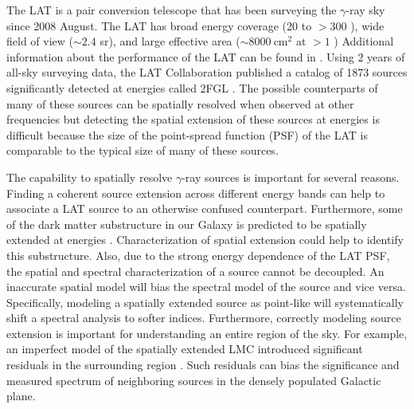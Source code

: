 \documentclass[12pt,preprint]{aastex}
\newcommand{\mev}{\text{MeV}\xspace}
\newcommand{\gev}{\text{GeV}\xspace}
\newcommand{\cm}{\text{cm}\xspace}
\begin{document}
The LAT is a pair conversion telescope that has been surveying the
$\gamma$-ray sky since 2008 August.  The LAT has broad energy coverage
(20 \mev to $>300$ \gev), wide field of view ($\sim 2.4$ sr), and large
effective area ($\sim 8000\ \cm^2$ at $>1$ \gev) 
Additional information about the performance of the LAT can be found in
\cite{atwood_LAT_mission}.
Using 2 years of all-sky surveying data, the LAT Collaboration published
a catalog of 1873
sources significantly detected at \gev energies called 2FGL \citep{second_cat}.
The possible counterparts of many of these sources can be spatially resolved
when observed at other frequencies but detecting the spatial extension
of these sources at \gev energies is difficult because the size of the
point-spread function (PSF) of the LAT is comparable to the typical size
of many of these sources.

The capability to spatially resolve \gev $\gamma$-ray
sources is important for several reasons.  
Finding a coherent source extension across different energy bands can
help to associate a LAT source to an otherwise confused counterpart.
Furthermore, some of the dark matter substructure in our Galaxy 
is predicted to be spatially extended at \gev energies \citep{pre_luanch_dark_matter_fermi}.  
Characterization of spatial extension could help to identify this substructure.
Also,
due to the strong energy dependence of the LAT PSF, the spatial and
spectral characterization of a source cannot be
decoupled. An inaccurate
spatial model will bias the spectral model of the source and vice versa. Specifically,
modeling a spatially extended source as point-like will systematically
shift a spectral analysis to softer indices. Furthermore, correctly
modeling source extension is important for 
understanding an entire region of the sky. For example,
an imperfect model of the spatially extended LMC introduced
significant residuals in the surrounding region \citep{first_cat,second_cat}.
Such residuals can bias the significance and measured spectrum of
neighboring sources in the densely populated Galactic plane.
\end{document}

